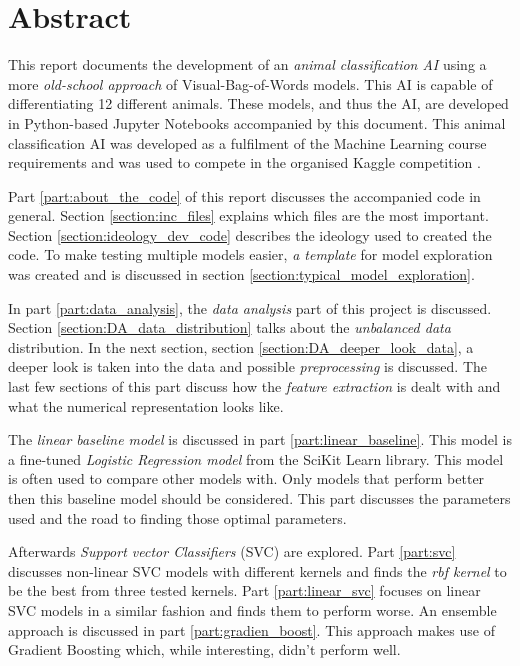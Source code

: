 \chapter*{Abstract}

This report documents the development of an \textit{animal classification AI} using a more \textit{old-school approach} of Visual-Bag-of-Words models.
This AI is capable of differentiating 12 different animals.
These models, and thus the AI, are developed in Python-based Jupyter Notebooks accompanied by this document.
This animal classification AI was developed as a fulfilment of the Machine Learning course requirements and was used to compete in the organised Kaggle competition \citep{kaggle_competition}.

Part \ref{part:about_the_code} of this report discusses the accompanied code in general.
Section \ref{section:inc_files} explains which files are the most important. 
Section \ref{section:ideology_dev_code} describes the ideology used to created the code. 
To make testing multiple models easier, \textit{a template} for model exploration was created and is discussed in section \ref{section:typical_model_exploration}.

In part \ref{part:data_analysis}, the \textit{data analysis} part of this project is discussed.
Section \ref{section:DA_data_distribution} talks about the \textit{unbalanced data} distribution.
In the next section, section \ref{section:DA_deeper_look_data}, a deeper look is taken into the data and possible \textit{preprocessing} is discussed.
The last few sections of this part discuss how the \textit{feature extraction} is dealt with and what the numerical representation looks like.

The \textit{linear baseline model} is discussed in part \ref{part:linear_baseline}.
This model is a fine-tuned \textit{Logistic Regression model} from the SciKit Learn library.
This model is often used to compare other models with.
Only models that perform better then this baseline model should be considered.
This part discusses the parameters used and the road to finding those optimal parameters.

Afterwards \textit{Support vector Classifiers} (SVC) are explored.
Part \ref{part:svc} discusses non-linear SVC models with different kernels and finds the \textit{rbf kernel} to be the best from three tested kernels.
Part \ref{part:linear_svc} focuses on linear SVC models in a similar fashion and finds them to perform worse.
An ensemble approach is discussed in part \ref{part:gradien_boost}.
This approach makes use of Gradient Boosting which, while interesting, didn't perform well.

